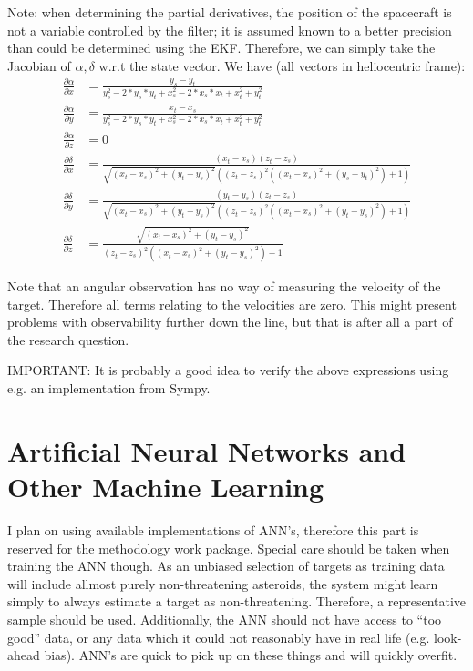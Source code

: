 \documentclass[a4paper,10pt]{article}
\begin{document}
Note: when determining the partial derivatives, the position of the spacecraft is not a variable controlled by the filter; it is assumed known to a better precision than could be determined using the EKF. Therefore, we can simply take the Jacobian of $\alpha, \delta$ w.r.t the state vector. We have (all vectors in heliocentric frame):
\begin{align}
 \frac{\partial \alpha}{\partial x} &= \frac{y_s - y_t}{y_s^2 - 2*y_s*y_t + x_s^2 - 2*x_s*x_t + x_t^2 + y_t^2} \\
 \frac{\partial \alpha}{\partial y} &= \frac{x_t - x_s}{y_s^2 - 2*y_s*y_t + x_s^2 - 2*x_s*x_t + x_t^2 + y_t^2} \\
 \frac{\partial \alpha}{\partial z} &= 0 \\
 \frac{\partial \delta}{\partial x} &= \frac{(x_t - x_s)(z_t-z_s)}{\sqrt{(x_t - x_s)^2 + (y_t - y_s)^2}\left((z_t - z_s)^2 \left((x_t - x_s)^2 + (y_s - y_t)^2\right) + 1 \right)} \\
 \frac{\partial \delta}{\partial y} &= \frac{(y_t - y_s)(z_t - z_s)}{\sqrt{(x_t - x_s)^2 + (y_t - y_s)^2}\left( (z_t - z_s)^2 \left( ( x_t - x_s)^2 + (y_t - y_s)^2\right) + 1 \right)}\\
 \frac{\partial \delta}{\partial z} &= \frac{\sqrt{(x_t - x_s)^2 + (y_t - y_s)^2}}{(z_t - z_s)^2\left( ( x_t - x_s)^2 + (y_t - y_s)^2\right) + 1}
\end{align}

Note that an angular observation has no way of measuring the velocity of the target. Therefore all terms relating to the velocities are zero. This might present problems with observability further down the line, but that is after all a part of the research question.

IMPORTANT: It is probably a good idea to verify the above expressions using e.g. an implementation from Sympy.


\section{Artificial Neural Networks and Other Machine Learning}

I plan on using available implementations of ANN's, therefore this part is reserved for the methodology work package. Special care should be taken when training the ANN though. As an unbiased selection of targets as training data will include allmost purely non-threatening asteroids, the system might learn simply to always estimate a target as non-threatening. Therefore, a representative sample should be used. Additionally, the ANN should not have access to ``too good'' data, or any data which it could not reasonably have in real life (e.g. look-ahead bias). ANN's are quick to pick up on these things and will quickly overfit. \\
\end{document}
